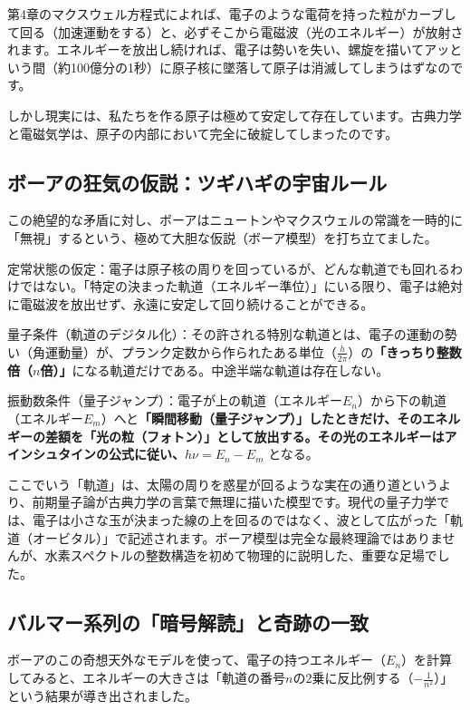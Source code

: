 第4章のマクスウェル方程式によれば、電子のような電荷を持った粒がカーブして回る（加速運動をする）と、必ずそこから電磁波（光のエネルギー）が放射されます。エネルギーを放出し続ければ、電子は勢いを失い、螺旋を描いてアッという間（約100億分の1秒）に原子核に墜落して原子は消滅してしまうはずなのです。

しかし現実には、私たちを作る原子は極めて安定して存在しています。古典力学と電磁気学は、原子の内部において完全に破綻してしまったのです。

\subsection{ボーアの狂気の仮説：ツギハギの宇宙ルール}

この絶望的な矛盾に対し、ボーアはニュートンやマクスウェルの常識を一時的に「無視」するという、極めて大胆な仮説（ボーア模型）を打ち立てました。

定常状態の仮定：電子は原子核の周りを回っているが、どんな軌道でも回れるわけではない。「特定の決まった軌道（エネルギー準位）」にいる限り、電子は絶対に電磁波を放出せず、永遠に安定して回り続けることができる。

量子条件（軌道のデジタル化）：その許される特別な軌道とは、電子の運動の勢い（角運動量）が、プランク定数から作られたある単位（\(\frac{h}{2\pi}\)）の\textbf{「きっちり整数倍（\(n\)倍）」}になる軌道だけである。中途半端な軌道は存在しない。

振動数条件（量子ジャンプ）：電子が上の軌道（エネルギー\(E_n\)）から下の軌道（エネルギー\(E_m\)）へと\textbf{「瞬間移動（量子ジャンプ）」したときだけ、そのエネルギーの差額を「光の粒（フォトン）」として放出する。その光のエネルギーはアインシュタインの公式に従い、\(h\nu = E_n - E_m\)} となる。

ここでいう「軌道」は、太陽の周りを惑星が回るような実在の通り道というより、前期量子論が古典力学の言葉で無理に描いた模型です。現代の量子力学では、電子は小さな玉が決まった線の上を回るのではなく、波として広がった「軌道（オービタル）」で記述されます。ボーア模型は完全な最終理論ではありませんが、水素スペクトルの整数構造を初めて物理的に説明した、重要な足場でした。

\subsection{バルマー系列の「暗号解読」と奇跡の一致}

ボーアのこの奇想天外なモデルを使って、電子の持つエネルギー（\(E_n\)）を計算してみると、エネルギーの大きさは「軌道の番号\(n\)の2乗に反比例する（\(-\frac{1}{n^2}\)）」という結果が導き出されました。

